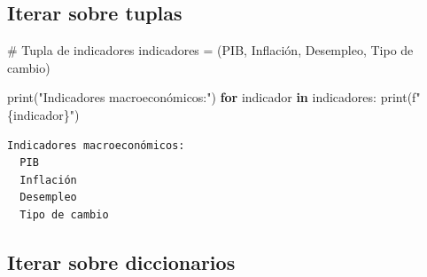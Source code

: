 \documentclass[
  doc,
  floatsintext,
  longtable,
  a4paper,
  nolmodern,
  notxfonts,
  notimes,
  12pt,
  colorlinks=true,linkcolor=blue,citecolor=blue,urlcolor=blue]{apa7}
\newenvironment{Shaded}{\begin{snugshade}}{\end{snugshade}}
\newcommand{\BuiltInTok}[1]{\textcolor[rgb]{0.00,0.23,0.31}{#1}}
\newcommand{\CommentTok}[1]{\textcolor[rgb]{0.37,0.37,0.37}{#1}}
\newcommand{\ControlFlowTok}[1]{\textcolor[rgb]{0.00,0.23,0.31}{\textbf{#1}}}
\newcommand{\KeywordTok}[1]{\textcolor[rgb]{0.00,0.23,0.31}{\textbf{#1}}}
\newcommand{\NormalTok}[1]{\textcolor[rgb]{0.00,0.23,0.31}{#1}}
\newcommand{\OperatorTok}[1]{\textcolor[rgb]{0.37,0.37,0.37}{#1}}
\newcommand{\SpecialCharTok}[1]{\textcolor[rgb]{0.37,0.37,0.37}{#1}}
\newcommand{\SpecialStringTok}[1]{\textcolor[rgb]{0.13,0.47,0.30}{#1}}
\newcommand{\StringTok}[1]{\textcolor[rgb]{0.13,0.47,0.30}{#1}}
\begin{document}
\subsection{Iterar sobre tuplas}\label{iterar-sobre-tuplas}

\begin{Shaded}
\begin{Highlighting}[]
\CommentTok{\# Tupla de indicadores}
\NormalTok{indicadores }\OperatorTok{=}\NormalTok{ (}\StringTok{\textquotesingle{}PIB\textquotesingle{}}\NormalTok{, }\StringTok{\textquotesingle{}Inflación\textquotesingle{}}\NormalTok{, }\StringTok{\textquotesingle{}Desempleo\textquotesingle{}}\NormalTok{, }\StringTok{\textquotesingle{}Tipo de cambio\textquotesingle{}}\NormalTok{)}

\BuiltInTok{print}\NormalTok{(}\StringTok{"Indicadores macroeconómicos:"}\NormalTok{)}
\ControlFlowTok{for}\NormalTok{ indicador }\KeywordTok{in}\NormalTok{ indicadores:}
    \BuiltInTok{print}\NormalTok{(}\SpecialStringTok{f"  }\SpecialCharTok{\{}\NormalTok{indicador}\SpecialCharTok{\}}\SpecialStringTok{"}\NormalTok{)}
\end{Highlighting}
\end{Shaded}

\begin{verbatim}
Indicadores macroeconómicos:
  PIB
  Inflación
  Desempleo
  Tipo de cambio
\end{verbatim}

\subsection{Iterar sobre diccionarios}\label{iterar-sobre-diccionarios}
\end{document}
